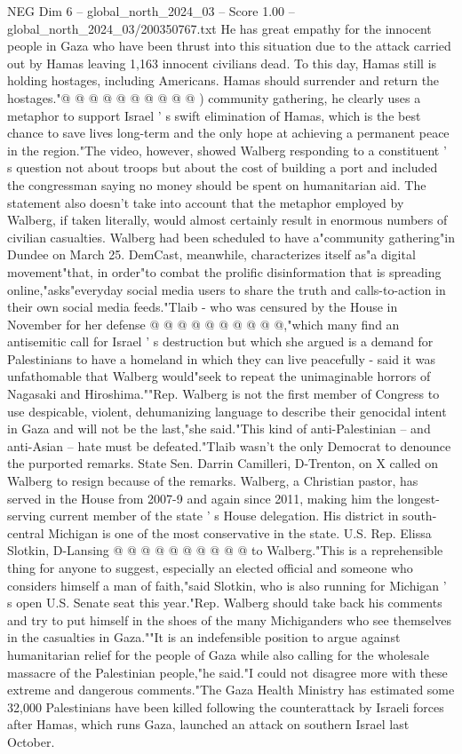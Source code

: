 \begin{textsample}{NEG Dim 6 – global\_north\_2024\_03 – Score 1.00 – global\_north\_2024\_03/200350767.txt}
He has great empathy for the innocent people in Gaza who have been thrust into this situation due to the attack carried out by Hamas leaving 1,163 innocent civilians dead.
To this day, Hamas still is holding hostages, including Americans.
Hamas should surrender and return the hostages."@ @ @ @ @ @ @ @ @ @ ) community gathering, he clearly uses a metaphor to support Israel ' s swift elimination of Hamas, which is the best chance to save lives long-term and the only hope at achieving a permanent peace in the region."The video, however, showed Walberg responding to a constituent ' s question not about troops but about the cost of building a port and included the congressman saying no money should be spent on humanitarian aid.
The statement also doesn't take into account that the metaphor employed by Walberg, if taken literally, would almost certainly result in enormous numbers of civilian casualties.
Walberg had been scheduled to have a"community gathering"in Dundee on March 25.
DemCast, meanwhile, characterizes itself as"a digital movement"that, in order"to combat the prolific disinformation that is spreading online,"asks"everyday social media users to share the truth and calls-to-action in their own social media feeds."Tlaib - who was censured by the House in November for her defense @ @ @ @ @ @ @ @ @ @,"which many find an antisemitic call for Israel ' s destruction but which she argued is a demand for Palestinians to have a homeland in which they can live peacefully - said it was unfathomable that Walberg would"seek to repeat the unimaginable horrors of Nagasaki and Hiroshima.""Rep.
Walberg is not the first member of Congress to use despicable, violent, dehumanizing language to describe their genocidal intent in Gaza and will not be the last,"she said."This kind of anti-Palestinian -- and anti-Asian -- hate must be defeated."Tlaib wasn't the only Democrat to denounce the purported remarks.
State Sen.
Darrin Camilleri, D-Trenton, on X called on Walberg to resign because of the remarks.
Walberg, a Christian pastor, has served in the House from 2007-9 and again since 2011, making him the longest-serving current member of the state ' s House delegation.
His district in south-central Michigan is one of the most conservative in the state.
U.S.
Rep.
Elissa Slotkin, D-Lansing @ @ @ @ @ @ @ @ @ @ to Walberg."This is a reprehensible thing for anyone to suggest, especially an elected official and someone who considers himself a man of faith,"said Slotkin, who is also running for Michigan ' s open U.S.
Senate seat this year."Rep.
Walberg should take back his comments and try to put himself in the shoes of the many Michiganders who see themselves in the casualties in Gaza.""It is an indefensible position to argue against humanitarian relief for the people of Gaza while also calling for the wholesale massacre of the Palestinian people,"he said."I could not disagree more with these extreme and dangerous comments."The Gaza Health Ministry has estimated some 32,000 Palestinians have been killed following the counterattack by Israeli forces after Hamas, which runs Gaza, launched an attack on southern Israel last October.

\end{textsample}
